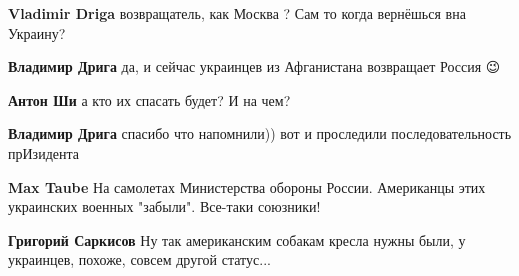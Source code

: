 \begin{itemize}
\begin{itemize}
 
\textbf{Vladimir Driga} возвращатель, как Москва ? Сам то когда вернёшься вна Украину?

 
\textbf{Владимир Дрига} да, и сейчас украинцев из Афганистана возвращает Россия 😉

 
\textbf{Антон Ши} а кто их спасать будет? И на чем?

 
\textbf{Владимир Дрига} спасибо что напомнили)) вот и проследили последовательность прИзидента

 
\textbf{Max Taube} На самолетах Министерства обороны России. Американцы этих украинских военных "забыли". Все-таки союзники!

 
\textbf{Григорий Саркисов} Ну так американским собакам кресла нужны были, у украинцев, похоже, совсем другой статус...


\end{itemize}
\end{itemize}
